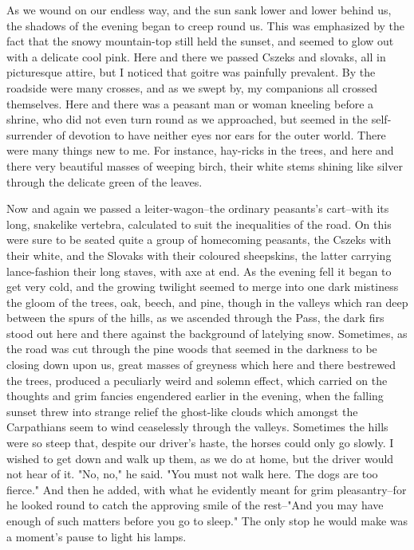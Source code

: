 As we wound on our endless way, and the sun sank lower and lower behind us, the shadows of the evening began to creep round us. This was emphasized by the fact that the snowy mountain-top still held the sunset, and seemed to glow out with a delicate cool pink. Here and there we passed Cszeks and slovaks, all in picturesque attire, but I noticed that goitre was painfully prevalent. By the roadside were many crosses, and as we swept by, my companions all crossed themselves. Here and there was a peasant man or woman kneeling before a shrine, who did not even turn round as we approached, but seemed in the self-surrender of devotion to have neither eyes nor ears for the outer world. There were many things new to me. For instance, hay-ricks in the trees, and here and there very beautiful masses of weeping birch, their white stems shining like silver through the delicate green of the leaves. 

Now and again we passed a leiter-wagon--the ordinary peasants's cart--with its long, snakelike vertebra, calculated to suit the inequalities of the road. On this were sure to be seated quite a group of homecoming peasants, the Cszeks with their white, and the Slovaks with their coloured sheepskins, the latter carrying lance-fashion their long staves, with axe at end. As the evening fell it began to get very cold, and the growing twilight seemed to merge into one dark mistiness the gloom of the trees, oak, beech, and pine, though in the valleys which ran deep between the spurs of the hills, as we ascended through the Pass, the dark firs stood out here and there against the background of latelying snow. Sometimes, as the road was cut through the pine woods that seemed in the darkness to be closing down upon us, great masses of greyness which here and there bestrewed the trees, produced a peculiarly weird and solemn effect, which carried on the thoughts and grim fancies engendered earlier in the evening, when the falling sunset threw into strange relief the ghost-like clouds which amongst the Carpathians seem to wind ceaselessly through the valleys. Sometimes the hills were so steep that, despite our driver's haste, the horses could only go slowly. I wished to get down and walk up them, as we do at home, but the driver would not hear of it. "No, no," he said. "You must not walk here. The dogs are too fierce." And then he added, with what he evidently meant for grim pleasantry--for he looked round to catch the approving smile of the rest--"And you may have enough of such matters before you go to sleep." The only stop he would make was a moment's pause to light his lamps. 

